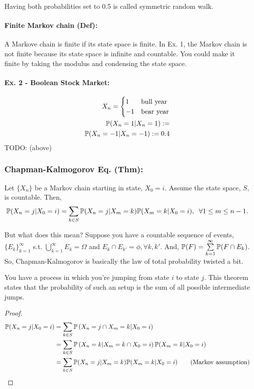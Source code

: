 Having both probabilities set to 0.5 is called symmetric random walk. 

\paragraph*{Finite Markov chain (Def): }A Markove chain is finite if its state space is finite. In Ex. 1, the Markov chain is not finite because its state space is infinite and countable. You could make it finite by taking the modulus and condensing the state space. 

\paragraph*{Ex. 2 - Boolean Stock Market: }
\[
\begin{aligned}
	X_n = 
		\begin{cases}
		1 & \text{bull year} \\
		-1 & \text{bear year} 
		\end{cases}	\\
	\mathbb{P}(X_n = 1 | X_n = 1) := \\
	\mathbb{P}(X_n = -1  | X_n = -1 ) := 0.4
\end{aligned}	
\]
TODO: (above)

\subsubsection*{Chapman-Kalmogorov Eq. (Thm): } 
Let $\{ X_n\}$ be a Markov chain starting in state, $X_0 = i$. Assume the state space, $S$, is countable. Then, 
\[ \mathbb{P}( X_n = j | X_0 = i ) 
	= \sum\limits_{k\in S} \mathbb{P}( X_n = j | X_m = k ) \mathbb{P}( X_m = k | X_0 = i ), \;\; \forall 1\leq m \leq n-1. \]

But what does this mean? Suppose you have a countable sequence of events, $\{ E_k \}_{k=1}^\infty$ s.t. $\bigcup_{k=1}^\infty E_k = \Omega$ and $E_k \cap E_{k'} = \phi, \forall k, k'$. And, $\mathbb{P}(F) = \sum\limits_{k=1}^\infty \mathbb{P}( F \cap E_k ) $. So, Chapman-Kalmogorov is basically the law of total probability twisted a bit. 

You have a process in which you're jumping from state $i$ to state $j$. This theorem states that the probability of such an setup is the sum of all possible intermediate jumps. 

\begin{proof}
	\begin{align*}
		\mathbb{P}( X_n = j | X_0 = i) 
			&= \sum\limits_{k\in S} \mathbb{P} \left( X_n = j \cap X_m = k | X_0 = i \right) \\
			&= \sum\limits_{k\in S} \mathbb{P} \left( X_n = k | X_m = k \cap X_0 = i \right) 
				\mathbb{P} (X_m = k | X_0 = i ) \\
			&= \sum\limits_{k\in S} \mathbb{P}( X_n = j | X_m = k ) \mathbb{P}( X_m = k | X_0 = i) \tag{Markov assumption}
	\end{align*}
\end{proof}

